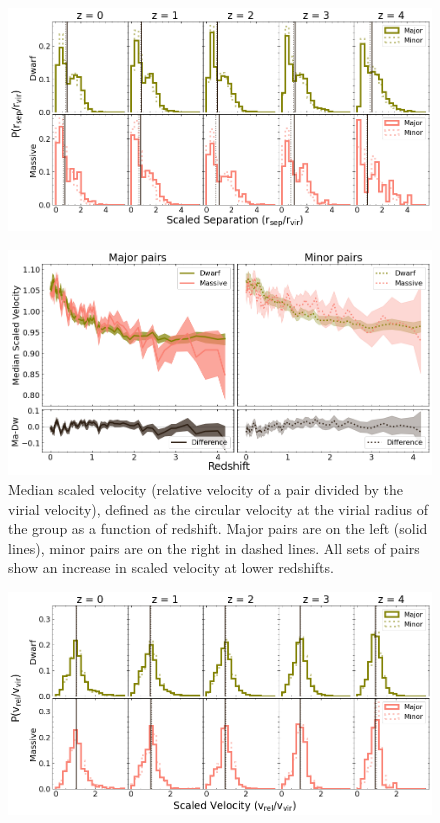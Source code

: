 \documentclass[twocolumn]{aastex631}
\begin{document}
\begin{figure}[htp]
  \centering
  \includegraphics[width=\textwidth]{scaledsep_distribution_1000.png}
  \caption{}
  \label{fig:sep-scaled-dist}
\end{figure} 


\begin{figure}[htp]
  \centering
  \includegraphics[width=\textwidth]{scaledvel_1000.png}
  \caption{Median scaled velocity (relative velocity of a pair divided by the virial velocity), defined as the circular velocity at the virial radius of the group as a function of redshift. 
  Major pairs are on the left (solid lines), minor pairs are on the right in dashed lines.
  All sets of pairs show an increase in scaled velocity at lower redshifts.
   
  }
  \label{fig:vel-scaled}
\end{figure} 

\begin{figure}[htp]
  \centering
  \includegraphics[width=\textwidth]{scaledvel_distribution_1000.png}
  \caption{}
  \label{fig:vel-scaled-dist}
\end{figure} 
\end{document}
